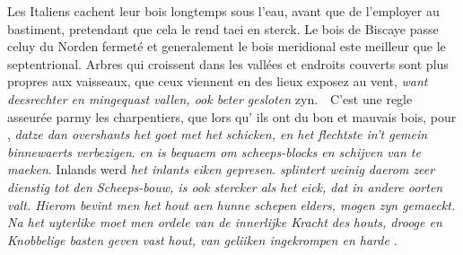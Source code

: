 \pend 
\pstart Les Italiens cachent leur bois\protect{} longtemps sous l'eau, avant que de l'employer au bastiment, pretendant que cela le rend taei en sterck.
\pend 
\pstart Le bois de Biscaye\protect{} passe celuy du Norden fermet\'{e} et generalement le bois meridional\protect{} este meilleur que le septentrional\protect{}. Arbres qui croissent dans les vall\'{e}es et endroits couverts sont plus propres aux vaisseaux\protect{}, que ceux viennent en des lieux exposez au vent, \textit{want deesrechter en mingequast vallen, ook beter gesloten} zyn.\ \textendash\ C'est une regle asseur\'{e}e parmy les charpentiers, que lors qu' ils ont du bon et mauvais bois\protect{}, pour , \textit{datze dan overshants het goet met het }\textit{ schicken, en het flechtste in't gemein binnewaerts verbezigen}.
\pend 
\pstart {} \textit{en \protect{} is bequaem om scheeps-blocks en schijven van te maeken}. Inlands  werd  \textit{het inlants eiken\protect{} gepresen}. 
\pend 
\pstart {}\protect{} \textit{splintert weinig daerom zeer dienstig tot den Scheeps-bouw\protect{}, is ook stercker als het eick\protect{}, dat in andere oorten valt. Hierom bevint men het hout\protect{} aen hunne schepen}\protect{} \textit{ elders, mogen zyn gemaeckt. Na het uyterlike moet men ordele van de innerlijke Kracht des }\textit{houts}\protect{}\textit{, drooge en Knobbelige basten geven vast }\textit{hout}\protect{}\textit{, van geliiken ingekrompen en harde }\textit{. }
